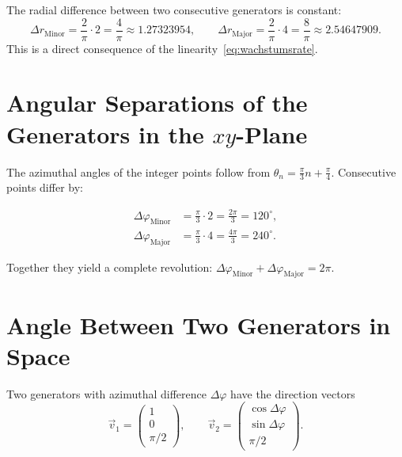 \begin{bemerkung}
The radial difference between two consecutive generators
is constant:
\[
  \Delta r_{\text{Minor}} = \frac{2}{\pi}\cdot 2 = \frac{4}{\pi}
  \approx 1.27323954,
  \qquad
  \Delta r_{\text{Major}} = \frac{2}{\pi}\cdot 4 = \frac{8}{\pi}
  \approx 2.54647909.
\]
This is a direct consequence of the linearity~\eqref{eq:wachstumsrate}.
\end{bemerkung}

\section{Angular Separations of the Generators in the \texorpdfstring{$xy$}{xy}-Plane}

The azimuthal angles of the integer points follow from
$\theta_n = \tfrac{\pi}{3}n + \tfrac{\pi}{4}$. Consecutive
points differ by:

\begin{align*}
  \Delta\varphi_{\text{Minor}} &= \frac{\pi}{3}\cdot 2 = \frac{2\pi}{3}
    = 120^\circ, \\
  \Delta\varphi_{\text{Major}} &= \frac{\pi}{3}\cdot 4 = \frac{4\pi}{3}
    = 240^\circ.
\end{align*}

Together they yield a complete revolution:
$\Delta\varphi_{\text{Minor}} + \Delta\varphi_{\text{Major}} = 2\pi$.

\section{Angle Between Two Generators in Space}

Two generators with azimuthal difference $\Delta\varphi$ have the
direction vectors
\[
  \vec{v}_1 = \begin{pmatrix}1\\0\\\pi/2\end{pmatrix},
  \qquad
  \vec{v}_2 = \begin{pmatrix}\cos\Delta\varphi\\\sin\Delta\varphi\\\pi/2\end{pmatrix}.
\]

